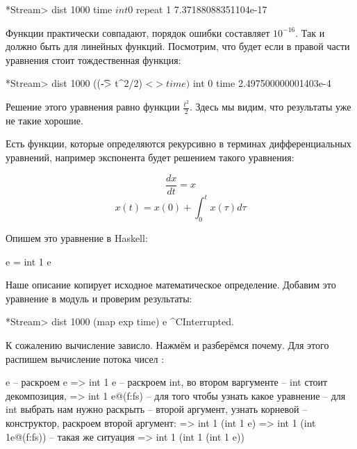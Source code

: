 \begin{code}
*Stream> dist 1000 time $ int 0 $ repeat 1
7.37188088351104e-17
\end{code}

Функции практически совпадают, порядок ошибки составляет
$10^{-16}$. Так и должно быть для линейных функций. 
Посмотрим, что будет если в правой части уравнения 
стоит тождественная функция:

\begin{code}
*Stream> dist 1000 ((\t -> t^2/2) <$> time) $ int 0 time
2.497500000001403e-4
\end{code}

Решение этого уравнения равно функции $\frac{t^2}{2}$. 
Здесь мы видим, что результаты уже не такие хорошие.

Есть функции, которые определяются рекурсивно 
в терминах дифференциальных уравнений, например 
экспонента будет решением такого уравнения:

\[ \frac{dx}{dt} = x \]
\[ x(t) = x(0) + \int_{0}^{t} x(\tau) d \tau \]

Опишем это уравнение в Haskell:


\begin{code}
e = int 1 e
\end{code}

Наше описание копирует исходное математическое
определение. Добавим это уравнение в модуль  
и проверим результаты:

\begin{code}
*Stream> dist 1000 (map exp time) e
^CInterrupted.
\end{code}

К сожалению вычисление зависло. Нажмём  и 
разберёмся почему. Для этого распишем вычисление потока чисел :


\begin{code}
        e                           -- раскроем e 
=>      int 1 e                     -- раскроем int, во втором варгументе
                                    -- int стоит декомпозиция, 
=>      int 1 e@(f:fs)              -- для того чтобы узнать какое уравнение 
                                    -- для int выбрать нам нужно раскрыть 
                                    -- второй аргумент, узнать корневой 
                                    -- конструктор, раскроем второй аргумент:
=>      int 1 (int 1 e)
=>      int 1 (int 1e@(f:fs))       -- такая же ситуация
=>      int 1 (int 1 (int 1 e))
\end{code}

